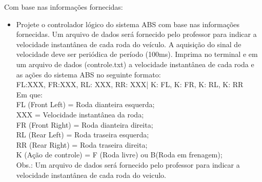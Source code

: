 \documentclass[a4paper,10pt]{article}
\begin{document}
\begin{enumerate}
  Com base nas informações fornecidas:\\
  \begin{itemize}
   \item Projete o controlador lógico do sistema ABS com base nas informações fornecidas. Um arquivo de dados será fornecido pelo professor para 
	indicar a velocidade instantânea de cada roda do veículo. A aquisição do sinal de velocidade deve ser periódica de período (100ms). Imprima 
	no terminal e em um arquivo de dados (controle.txt) a velocidade instantânea de cada roda e as ações do sistema ABS no seguinte formato:\\
	FL:XXX, FR:XXX, RL: XXX, RR: XXX| K: FL, K: FR, K: RL, K: RR\\
	Em que:\\
	FL (Front Left) = Roda dianteira esquerda;\\
	XXX = Velocidade instantânea da roda;\\
	FR (Front Right) = Roda dianteira direita;\\
	RL (Rear Left) = Roda traseira esquerda;\\
	RR (Rear Right) = Roda traseira direita;\\
	K (Ação de controle) = F (Roda livre) ou B(Roda em frenagem);\\
	Obs.: Um arquivo de dados será fornecido pelo professor para indicar a velocidade instantânea de cada roda do veiculo.\\

  \end{itemize}


\end{enumerate}
\end{document}
